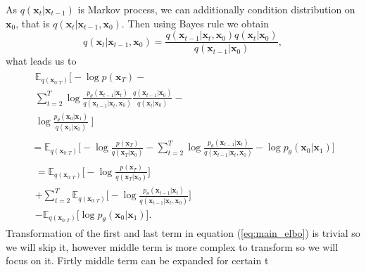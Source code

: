 \documentclass[10pt]{article}
\begin{document}
As $ q( \textbf{x}_{t}|  \textbf{x}_{t -1 })$ is Markov process, we can additionally condition distribution on $\textbf{x}_{0}$,
that is $ q( \textbf{x}_{t}|  \textbf{x}_{t -1},\textbf{x}_{0} )$. 
Then using Bayes rule we obtain
\begin{equation}
    q( \textbf{x}_{t}|  \textbf{x}_{t -1 },  \textbf{x}_{0}) = 
    \frac{ q( \textbf{x}_{t-1}|  \textbf{x}_{t},  \textbf{x}_{0}) q( \textbf{x}_{t}| \textbf{x}_{0})}
    {q( \textbf{x}_{t-1}| \textbf{x}_{0})},
\end{equation}
what leads us to
\begin{gather}
    \begin{gathered}
    \mathbb{E}_{q(\textbf{x}_{0:T})} \Bigg[ -\log p( \textbf{x}_{T}) - \\ \sum_{t=2}^{T}\log
    \frac{ p_{\theta}( \textbf{x}_{t-1}|  \textbf{x}_{t }  )   }
    { q( \textbf{x}_{t-1}|  \textbf{x}_{t},  \textbf{x}_{0}  )}
    \frac{q( \textbf{x}_{t-1}|  \textbf{x}_{0})}{q( \textbf{x}_{t}|  \textbf{x}_{0})} - \\ \log
    \frac{ p_{\theta}( \textbf{x}_{0}|  \textbf{x}_{1}  )   }
    { q( \textbf{x}_{1}|  \textbf{x}_{0}  )}
    \ \Bigg]
    \end{gathered}
    \\
    =  \mathbb{E}_{q(\textbf{x}_{0:T})} 
    \Bigg[ -\log \frac{p( \textbf{x}_{T})}{q( \textbf{x}_{T}|  \textbf{x}_{0})} -  \sum_{t=2}^{T}\log
    \frac{ p_{\theta}( \textbf{x}_{t-1}|  \textbf{x}_{t }  )   }
    { q( \textbf{x}_{t-1}|  \textbf{x}_{t},  \textbf{x}_{0}  )}
    -\log  p_{\theta}( \textbf{x}_{0}|  \textbf{x}_{1}  )    \Bigg] \\
    \begin{gathered}
    =\label{eq:main_elbo}
    \mathbb{E}_{q(\textbf{x}_{0:T})} 
    \Bigg[ -\log \frac{p( \textbf{x}_{T})}{q( \textbf{x}_{T}|  \textbf{x}_{0})}\Bigg]
    \\+ \sum_{t=2}^{T} \mathbb{E}_{q(\textbf{x}_{0:T})}  
    \Bigg[  -\log
    \frac{ p_{\theta}( \textbf{x}_{t-1}|  \textbf{x}_{t }  )   }
    { q( \textbf{x}_{t-1}|  \textbf{x}_{t},  \textbf{x}_{0}  )}\Bigg]
    \\- \mathbb{E}_{q(\textbf{x}_{0:T})} 
    \Bigg[\log  p_{\theta}( \textbf{x}_{0}|  \textbf{x}_{1}  )    \Bigg] .
    \end{gathered}
\end{gather}
Transformation of the first and last term in equation (\ref{eq:main_elbo}) is trivial so we will skip it, however middle term is more complex to transform so we will focus on it. Firtly middle term can be expanded for certain t
\end{document}
